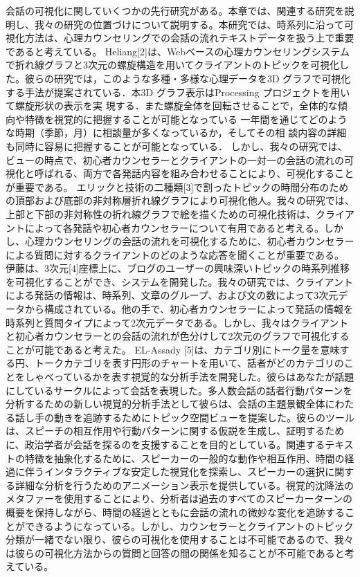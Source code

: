 \documentclass[shuuron]{kuee}
\begin{document}
会話の可視化に関していくつかの先行研究がある。本章では、関連する研究を説明し、我々の研究の位置づけについて説明する。本研究では、時系列に沿って可視化方法は、心理カウンセリングでの会話の流れテキストデータを扱う上で重要であると考えている。
Heliang[2]は、Webベースの心理カウンセリングシステムで折れ線グラフと3次元の螺旋構造を用いてクライアントのトピックを可視化した。彼らの研究では，このような多種・多様な心理データを3D グラフで可視化する手法が提案されている．本3D グラフ表示はProcessing プロジェクトを用いて螺旋形状の表示を実
現する．また螺旋全体を回転させることで，全体的な傾向や特徴を視覚的に把握することが可能となっている
一年間を通じてどのような時期（季節，月）に相談量が多くなっているか，そしてその相
談内容の詳細も同時に容易に把握することが可能となっている．
しかし、我々の研究では、ビューの時点で、初心者カウンセラーとクライアントの一対一の会話の流れの可視化と呼ばれる、両方で各発話内容を組み合わせることにより、可視化することが重要である。
 エリックと技術の二種類[3]で割ったトピックの時間分布のための頂部および底部の非対称層折れ線グラフにより可視化他人。我々の研究では、上部と下部の非対称性の折れ線グラフで絵を描くための可視化技術は、クライアントによって各発話や初心者カウンセラーについて有用であると考える。しかし、心理カウンセリングの会話の流れを可視化するために、初心者カウンセラーによる質問に対するクライアントのどのような応答を聞くことが重要である。
 伊藤は、3次元[4]座標上に、ブログのユーザーの興味深いトピックの時系列推移を可視化することができ、システムを開発した。我々の研究では、クライアントによる発話の情報は、時系列、文章のグループ、および文の数によって3次元データから構成されている。他の手で、初心者カウンセラーによって発話の情報を時系列と質問タイプによって2次元データである。しかし、我々はクライアントと初心者カウンセラーとの会話の流れが色分けして2次元のグラフで可視化することが可能であると考えた。
  EL-Assady [5]は、カテゴリ別にトーク量を意味する円、トークカテゴリを表す円形のチャートを用いて、話者がどのカテゴリのことをしゃべっているかを表す視覚的な分析手法を開発した。彼らはあなたが話題にしているサークルによって会話を表現した。多人数会話の話者行動パターンを分析するための新しい視覚的分析手法として彼らは、会話の主題景観全体にわたる話し手の動きを追跡するためにトピック空間ビューを提案した。彼らのツールは、スピーチの相互作用や行動パターンに関する仮説を生成し、証明するために、政治学者が会話を探るのを支援することを目的としている。関連するテキストの特徴を抽象化するために、スピーカーの一般的な動作や相互作用、時間の経過に伴うインタラクティブな安定した視覚化を探索し、スピーカーの選択に関する詳細な分析を行うためのアニメーション表示を提供している。視覚的沈降法のメタファーを使用することにより、分析者は過去のすべてのスピーカーターンの概要を保持しながら、時間の経過とともに会話の流れの微妙な変化を追跡することができるようになっている。しかし、カウンセラーとクライアントのトピック分類が一緒でない限り、彼らの可視化を使用することは不可能であるので、我々は彼らの可視化方法からの質問と回答の間の関係を知ることが不可能であると考えている。
\end{document}
